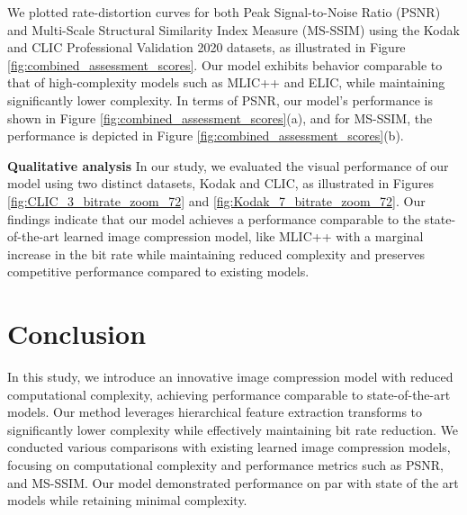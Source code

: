 \documentclass{article}
\begin{document}
We plotted rate-distortion curves for both Peak Signal-to-Noise Ratio (PSNR) and Multi-Scale Structural Similarity Index Measure (MS-SSIM) using the Kodak and CLIC Professional Validation 2020 datasets, as illustrated in Figure \ref{fig:combined_assessment_scores}. Our model exhibits behavior comparable to that of high-complexity models such as MLIC++ \cite{jiangMLICLinearComplexity2024} and ELIC, while maintaining significantly lower complexity. In terms of PSNR, our model's performance is shown in Figure \ref{fig:combined_assessment_scores}(a), and for MS-SSIM, the performance is depicted in Figure \ref{fig:combined_assessment_scores}(b).


\noindent\textbf{Qualitative analysis} 
In our study, we evaluated the visual performance of our model using two distinct datasets, Kodak and CLIC, as illustrated in Figures \ref{fig:CLIC_3_bitrate_zoom_72} and \ref{fig:Kodak_7_bitrate_zoom_72}. Our findings indicate that our model achieves a performance comparable to the state-of-the-art learned image compression model, like MLIC++ with a marginal increase in the bit rate while maintaining reduced complexity and preserves competitive performance compared to existing models. 

\section{Conclusion}

In this study, we introduce an innovative image compression model with reduced computational complexity, achieving performance comparable to state-of-the-art models. Our method leverages hierarchical feature extraction transforms to significantly lower complexity while effectively maintaining bit rate reduction. We conducted various comparisons with existing learned image compression models, focusing on computational complexity and performance metrics such as PSNR, and MS-SSIM. 
 Our model demonstrated performance on par with state of the art models while retaining minimal complexity.


\end{document}
